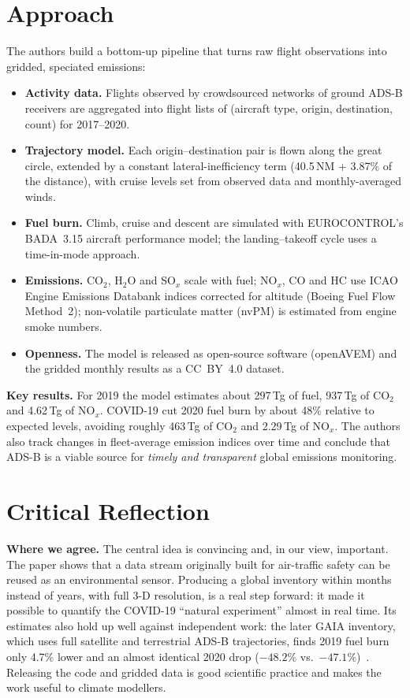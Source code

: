 \documentclass[11pt,a4paper]{article}
\begin{document}
\section{Approach}
The authors build a bottom-up pipeline that turns raw flight observations into gridded, speciated emissions:
\begin{itemize}
  \item \textbf{Activity data.} Flights observed by crowdsourced networks of ground ADS-B receivers are
  aggregated into flight lists of (aircraft type, origin, destination, count) for 2017--2020.
  \item \textbf{Trajectory model.} Each origin--destination pair is flown along the great circle,
  extended by a constant lateral-inefficiency term (40.5\,NM + 3.87\% of the distance), with cruise
  levels set from observed data and monthly-averaged winds.
  \item \textbf{Fuel burn.} Climb, cruise and descent are simulated with EUROCONTROL's BADA~3.15
  aircraft performance model; the landing--takeoff cycle uses a time-in-mode approach.
  \item \textbf{Emissions.} CO$_2$, H$_2$O and SO$_x$ scale with fuel; NO$_x$, CO and HC use ICAO Engine
  Emissions Databank indices corrected for altitude (Boeing Fuel Flow Method~2); non-volatile particulate
  matter (nvPM) is estimated from engine smoke numbers.
  \item \textbf{Openness.} The model is released as open-source software (openAVEM) and the gridded
  monthly results as a CC~BY~4.0 dataset.
\end{itemize}
\textbf{Key results.} For 2019 the model estimates about 297\,Tg of fuel, 937\,Tg of CO$_2$ and 4.62\,Tg of
NO$_x$. COVID-19 cut 2020 fuel burn by about 48\% relative to expected levels, avoiding roughly 463\,Tg of
CO$_2$ and 2.29\,Tg of NO$_x$. The authors also track changes in fleet-average emission indices over time
and conclude that ADS-B is a viable source for \emph{timely and transparent} global emissions monitoring.

\section{Critical Reflection}
\textbf{Where we agree.} The central idea is convincing and, in our view, important. The paper shows that a
data stream originally built for air-traffic safety can be reused as an environmental sensor. Producing a
global inventory within months instead of years, with full 3-D resolution, is a real step forward: it made
it possible to quantify the COVID-19 ``natural experiment'' almost in real time. Its estimates also hold
up well against independent work: the later GAIA inventory, which uses full satellite and terrestrial ADS-B
trajectories, finds 2019 fuel burn only 4.7\% lower and an almost identical 2020 drop
($-48.2\%$ vs.\ $-47.1\%$)~\cite{teoh2024}. Releasing the code and gridded data is good scientific practice
and makes the work useful to climate modellers.
\end{document}
